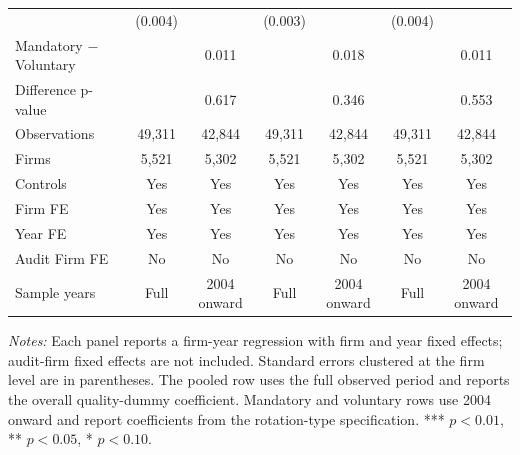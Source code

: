 \begin{table}[htbp]
\begin{threeparttable}
{\begin{tabular}{l cc cc cc}
 & (0.004) &  & (0.003) &  & (0.004) &  \\
Mandatory $-$ Voluntary &  & 0.011 &  & 0.018 &  & 0.011 \\
Difference p-value &  & 0.617 &  & 0.346 &  & 0.553 \\
Observations & 49,311 & 42,844 & 49,311 & 42,844 & 49,311 & 42,844 \\
Firms & 5,521 & 5,302 & 5,521 & 5,302 & 5,521 & 5,302 \\
\midrule
Controls & Yes & Yes & Yes & Yes & Yes & Yes \\
Firm FE & Yes & Yes & Yes & Yes & Yes & Yes \\
Year FE & Yes & Yes & Yes & Yes & Yes & Yes \\
Audit Firm FE & No & No & No & No & No & No \\
Sample years & Full & 2004 onward & Full & 2004 onward & Full & 2004 onward \\
\bottomrule
\end{tabular}}
\begin{tablenotes}\footnotesize
\item \textit{Notes:} Each panel reports a firm-year regression with firm and year fixed effects; audit-firm fixed effects are not included. Standard errors clustered at the firm level are in parentheses. The pooled row uses the full observed period and reports the overall quality-dummy coefficient. Mandatory and voluntary rows use 2004 onward and report coefficients from the rotation-type specification. *** \(p<0.01\), ** \(p<0.05\), * \(p<0.10\).
\end{tablenotes}
\end{threeparttable}
\end{table}
